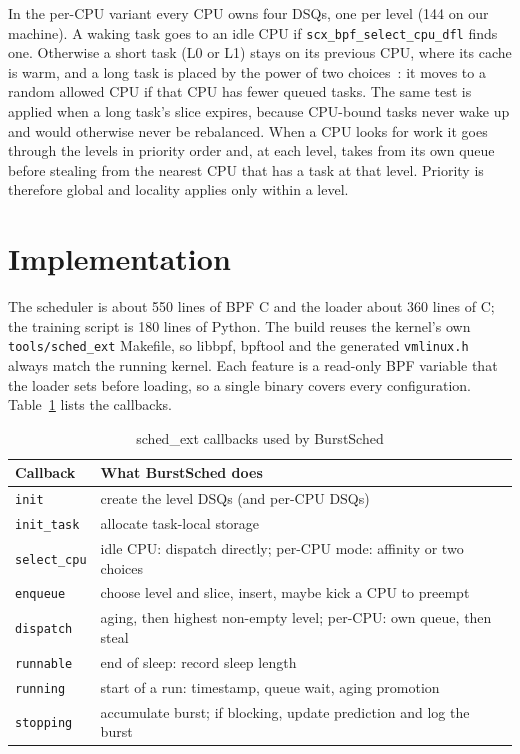 \documentclass[conference]{IEEEtran}
\newcommand{\code}[1]{\texttt{\small #1}}
\begin{document}
In the per-CPU variant every CPU owns four DSQs, one per level (144 on our machine). A waking task
goes to an idle CPU if \code{scx\_bpf\_select\_cpu\_dfl} finds one. Otherwise a short task (L0
or L1) stays on its previous CPU, where its cache is warm, and a long task is placed by the
power of two choices~\cite{twochoices}: it moves to a random allowed CPU if that CPU has fewer
queued tasks. The same test is applied when a long task's slice expires, because CPU-bound tasks
never wake up and would otherwise never be rebalanced. When a CPU looks for work it goes through
the levels in priority order and, at each level, takes from its own queue before stealing from
the nearest CPU that has a task at that level. Priority is therefore global and locality applies
only within a level.

\section{Implementation}\label{sec:impl}

The scheduler is about 550 lines of BPF C and the loader about 360 lines of C; the training
script is 180 lines of Python. The build reuses the kernel's own \code{tools/sched\_ext}
Makefile, so libbpf, bpftool and the generated \code{vmlinux.h} always match the running
kernel. Each feature is a read-only BPF variable that the loader sets before loading, so a single
binary covers every configuration. Table~\ref{tab:callbacks} lists the callbacks.

\begin{table}[t]
\caption{sched\_ext callbacks used by BurstSched}
\label{tab:callbacks}
\centering
\footnotesize
\begin{tabular}{@{}lp{5.3cm}@{}}
\toprule
Callback & What BurstSched does \\
\midrule
\code{init} & create the level DSQs (and per-CPU DSQs) \\
\code{init\_task} & allocate task-local storage \\
\code{select\_cpu} & idle CPU: dispatch directly; per-CPU mode: affinity or two choices \\
\code{enqueue} & choose level and slice, insert, maybe kick a CPU to preempt \\
\code{dispatch} & aging, then highest non-empty level; per-CPU: own queue, then steal \\
\code{runnable} & end of sleep: record sleep length \\
\code{running} & start of a run: timestamp, queue wait, aging promotion \\
\code{stopping} & accumulate burst; if blocking, update prediction and log the burst \\
\bottomrule
\end{tabular}
\end{table}
\end{document}
